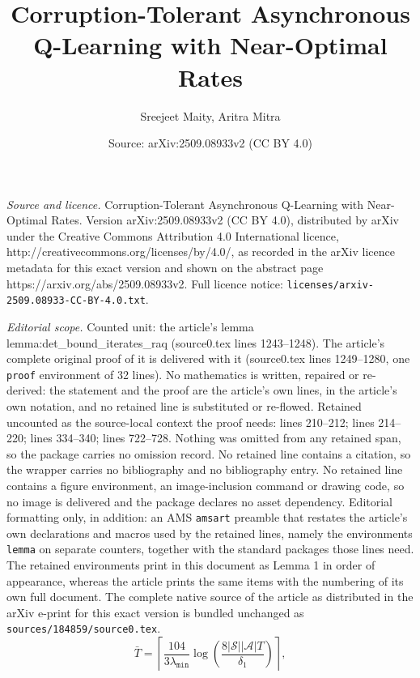 \documentclass[10pt,a4paper]{amsart}
\title{Corruption-Tolerant Asynchronous Q-Learning with Near-Optimal Rates}
\author{Sreejeet Maity, Aritra Mitra}
\date{Source: arXiv:2509.08933v2 (CC BY 4.0)}
\begin{document}
\maketitle

\noindent\emph{Source and licence.} Corruption-Tolerant Asynchronous Q-Learning with Near-Optimal Rates. Version arXiv:2509.08933v2 (CC BY 4.0), distributed by arXiv under the Creative Commons Attribution 4.0 International licence, http://creativecommons.org/licenses/by/4.0/, as recorded in the arXiv licence metadata for this exact version and shown on the abstract page https://arxiv.org/abs/2509.08933v2. Full licence notice: \texttt{licenses/arxiv-2509.08933-CC-BY-4.0.txt}.\par\smallskip

\noindent\textit{Editorial scope.} Counted unit: the article's lemma lemma:det\_bound\_iterates\_raq (source0.tex lines 1243--1248). The article's complete original proof of it is delivered with it (source0.tex lines 1249--1280, one \texttt{proof} environment of 32 lines). No mathematics is written, repaired or re-derived: the statement and the proof are the article's own lines, in the article's own notation, and no retained line is substituted or re-flowed.  Retained uncounted as the source-local context the proof needs: lines 210--212; lines 214--220; lines 334--340; lines 722--728.  Nothing was omitted from any retained span, so the package carries no omission record.  No retained line contains a citation, so the wrapper carries no bibliography and no bibliography entry.  No retained line contains a figure environment, an image-inclusion command or drawing code, so no image is delivered and the package declares no asset dependency.  Editorial formatting only, in addition: an AMS \texttt{amsart} preamble that restates the article's own declarations and macros used by the retained lines, namely the environments \texttt{lemma} on separate counters, together with the standard packages those lines need.  The retained environments print in this document as Lemma 1 in order of appearance, whereas the article prints the same items with the numbering of its own full document.  The complete native source of the article as distributed in the arXiv e-print for this exact version is bundled unchanged as \texttt{sources/184859/source0.tex}.
\begin{equation}\label{eqn:Tbar}
\bar{T} = \left\lceil \frac{104}{3 \lambda_{\texttt{min}}} \log\left( \frac{8 |\mathcal{S}||\mathcal{A}| T}{\delta_1} \right) \right\rceil, 
\end{equation}
\end{document}
